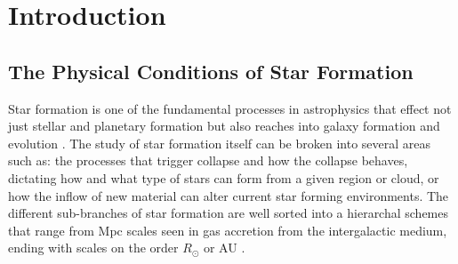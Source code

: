 \chapter{Introduction}\label{intro}

\section{The Physical Conditions of Star Formation}

Star formation is one of the fundamental processes in astrophysics that effect not just stellar and planetary formation but also reaches into galaxy formation and evolution \citep{kennicutt2012}.  The study of star formation itself can be broken into several areas such as: the processes that trigger collapse and how the collapse behaves, dictating how and what type of stars can form from a given region or cloud, or how the inflow of new material can alter current star forming environments.  The different sub-branches of star formation are well sorted into a hierarchal schemes that range from Mpc scales seen in gas accretion from the intergalactic medium, ending with scales on the order $R_\odot$ or AU \citep{kennicutt2012}.  






